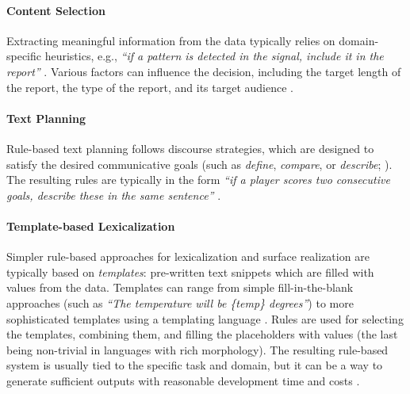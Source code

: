{\paragraph{Content Selection}
Extracting meaningful information from the data typically relies on domain-specific heuristics, e.g., \textit{``if a pattern is detected in the signal, include it in the report''} \cite{portet2009automatic}. Various factors can influence the decision, including the target length of the report, the type of the report, and its target audience \cite{gkatziaContentSelectionDatatoText2016}.

\paragraph{Text Planning} Rule-based text planning follows discourse strategies, which are designed to satisfy the desired communicative goals (such as \emph{define}, \emph{compare}, or \emph{describe}; \citealp{mckeown1985text}). The resulting rules are typically in the form \textit{``if a player scores two consecutive goals, describe these in the same sentence''}  \cite{gattSurveyStateArt2018}.


\paragraph{Template-based Lexicalization}
Simpler rule-based approaches for lexicalization and surface realization are typically based on \emph{templates}: pre-written text snippets which are filled with values from the data. Templates can range from simple fill-in-the-blank approaches (such as \textit{``The temperature will be \{temp\} degrees''}) to more sophisticated templates using a templating language \cite{gatt2009simplenlg,reiter2016nlg}.  Rules are used for selecting the templates, combining them, and filling the placeholders with values (the last being non-trivial in languages with rich morphology). The resulting rule-based system is usually tied to the specific task and domain, but it can be a way to generate sufficient outputs with reasonable development time and costs \cite{vanderleeAutomatedLearningTemplates2018}.


}
